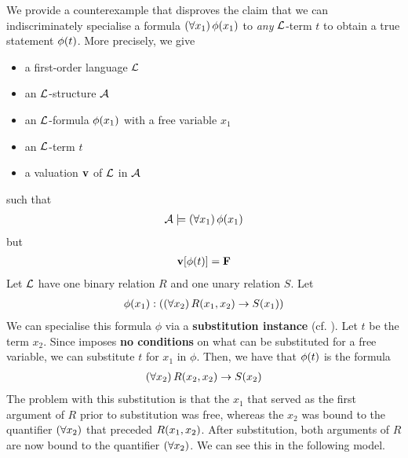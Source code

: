 \begin{boxcexample}
    We provide a counterexample that disproves the claim that we can indiscriminately specialise a formula $\left( \forall x_1 \right) \phi\!\left( x_1 \right)$ to \textit{any} $\mathcal{L}$-term $t$ to obtain a true statement $\phi\!\left( t \right)$. More precisely, we give
    \begin{itemize}
        \item a first-order language $\mathcal{L}$
        \item an $\mathcal{L}$-structure $\mathcal{A}$
        \item an $\mathcal{L}$-formula $\phi\!\left( x_1 \right)$ with a free variable $x_1$
        \item an $\mathcal{L}$-term $t$
        \item a valuation $\mathbf{v}$ of $\mathcal{L}$ in $\mathcal{A}$
    \end{itemize}
    such that
    \begin{align*}
        \mathcal{A} \models \left( \forall x_1 \right)\phi\!\left( x_1 \right)
    \end{align*}
    but
    \begin{align*}
        \mathbf{v}\!\left[ \phi\!\left( t \right) \right] = \mathbf{F}
    \end{align*}
    Let $\mathcal{L}$ have one binary relation $R$ and one unary relation $S$. Let
    \begin{align*}
        \phi\!\left( x_1 \right) : \left( \left( \forall x_2 \right)R\!\left( x_1, x_2 \right) \to S\!\left( x_1 \right) \right)
    \end{align*}
    We can specialise this formula $\phi$ via a \textbf{substitution instance} (cf. ). Let $t$ be the term $x_2$. Since  imposes \textbf{no conditions} on what can be substituted for a free variable, we can substitute $t$ for $x_1$ in $\phi$. Then, we have that $\phi\!\left( t \right)$ is the formula
    \begin{align*}
        \left( \forall x_2 \right)R\!\left( x_2, x_2 \right) \to S\!\left( x_2 \right)
    \end{align*}
    The problem with this substitution is that the $x_1$ that served as the first argument of $R$ prior to substitution was free, whereas the $x_2$ was bound to the quantifier $\left( \forall x_2 \right)$ that preceded $R\!\left( x_1, x_2 \right)$. After substitution, both arguments of $R$ are now bound to the quantifier $\left( \forall x_2 \right)$. We can see this in the following model. \newline


\end{boxcexample}
